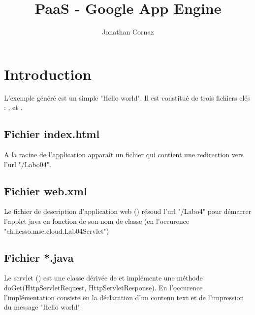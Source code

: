 \documentclass[french]{msereport}
\title{PaaS - Google App Engine}
\author{Jonathan Cornaz}
\begin{document}
	
	\section{Introduction}

		L'exemple généré est un simple "Hello world". Il est constitué de trois fichiers clés : ,  et .
		
		\subsection{Fichier index.html}
			A la racine de l'application apparaît un fichier  qui contient une redirection vers l'url "/Labo04".
		
		\subsection{Fichier web.xml}
			Le fichier de description d'application web () résoud l'url "/Labo4" pour démarrer l'applet java en fonction de son nom de classe (en l'occurence "ch.hesso.mse.cloud.Lab04Servlet")
		
		\subsection{Fichier *.java}
			Le servlet () est une classe dérivée de  et implémente une méthode {doGet(HttpServletRequest, HttpServletResponse)}. En l'occurence l'implémentation consiste en la déclaration d'un contenu text et de l'impression du message "Hello world".
			
\end{document}
